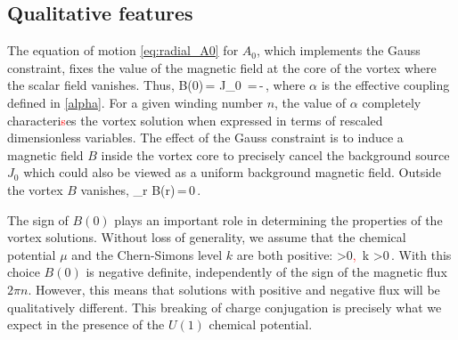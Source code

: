 \subsection{Qualitative features}
The equation of motion \eqref{eq:radial_A0} for $A_0$, which implements the Gauss constraint, fixes the value of the magnetic field at the core of the vortex where the scalar field vanishes. Thus,
\be
B(0)\,=\,\,J_0
\,=\,-\,,
\ee
where $\alpha$ is the effective coupling defined in \eqref{alpha}. For a given winding number $n$, the value of $\alpha$ completely characteri\textcolor{red}{s}es the vortex solution when expressed in terms of rescaled dimensionless variables.
The effect of the Gauss constraint is to induce a magnetic field $B$ inside the vortex core to precisely cancel the background source $J_0$ which could also  be viewed as a uniform background magnetic field.  Outside the vortex $B$ vanishes,
\be
\lim_{r\to\infty} B(r)\,=\,0\,.
\ee

The sign of $B(0)$ plays an important role in determining the properties of the vortex solutions. Without loss of generality, we assume that the chemical potential $\mu$ and the Chern-Simons level $k$ are both positive:
\be
\mu >0\textcolor{red}{,}\, \qquad \qquad k >0\,.
\ee
With this choice $B(0)$ is negative definite,   independently of the sign of the magnetic flux $2\pi n$. However, this means that solutions with positive and negative flux will be qualitatively different. This breaking of charge conjugation is precisely what we expect in the presence of the $U(1)$ chemical potential.


